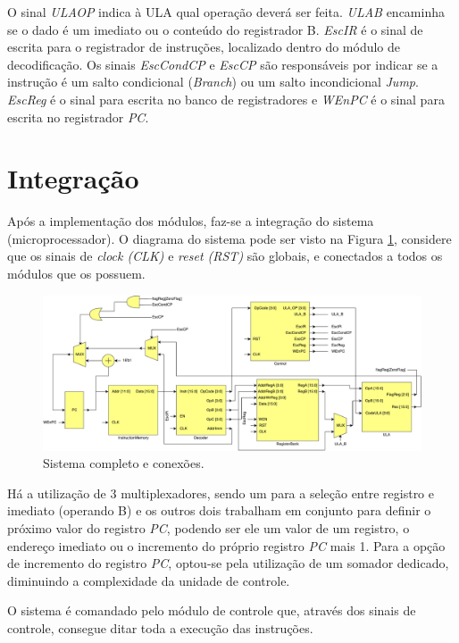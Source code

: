 \documentclass[11pt,a4paper,titlepage]{article}
\begin{document}
O sinal \textit{ULAOP} indica à ULA qual operação deverá ser feita. \textit{ULAB} encaminha se o dado é um imediato ou o conteúdo do registrador B. \textit{EscIR} é o sinal de escrita para o registrador de instruções, localizado dentro do módulo de decodificação. Os sinais \textit{EscCondCP} e \textit{EscCP} são responsáveis por indicar se a instrução é um salto condicional (\textit{Branch}) ou um salto incondicional \textit{Jump}. \textit{EscReg} é o sinal para escrita no banco de registradores e \textit{WEnPC} é o sinal para escrita no registrador \textit{PC}.

\section{Integração}

Após a implementação dos módulos, faz-se a integração do sistema (microprocessador). O diagrama do sistema pode ser visto na Figura \ref{fig:microprocessor}, considere que os sinais de \textit{clock (CLK)} e \textit{reset (RST)} são globais, e conectados a todos os módulos que os possuem.

\begin{figure}[h]
\centering
\includegraphics[scale=0.4]{images/Microprocessor.pdf}
\caption{Sistema completo e conexões.}
\label{fig:microprocessor}
\end{figure}

Há a utilização de 3 multiplexadores, sendo um para a seleção entre registro e imediato (operando B) e os outros dois trabalham em conjunto para definir o próximo valor do registro \textit{PC}, podendo ser ele um valor de um registro, o endereço imediato ou o incremento do próprio registro \textit{PC} mais 1. Para a opção de incremento do registro \textit{PC}, optou-se pela utilização de um somador dedicado, diminuindo a complexidade da unidade de controle.

O sistema é comandado pelo módulo de controle que, através dos sinais de controle, consegue ditar toda a execução das instruções.
\end{document}
